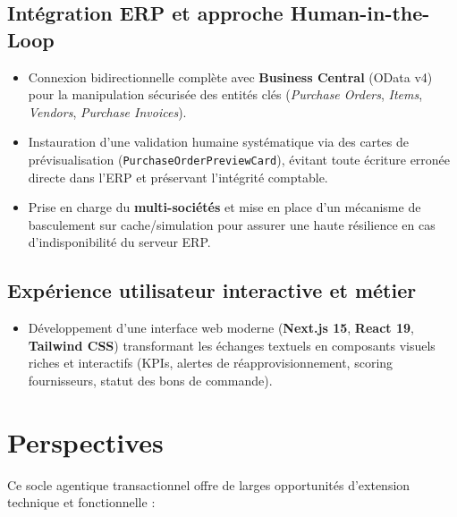 \subsection{Intégration ERP et approche Human-in-the-Loop}
\begin{itemize}
    \item Connexion bidirectionnelle complète avec \textbf{Business Central} (OData v4) pour la manipulation sécurisée des entités clés (\textit{Purchase Orders}, \textit{Items}, \textit{Vendors}, \textit{Purchase Invoices}).
    \item Instauration d'une validation humaine systématique via des cartes de prévisualisation (\texttt{PurchaseOrderPreviewCard}), évitant toute écriture erronée directe dans l'ERP et préservant l'intégrité comptable.
    \item Prise en charge du \textbf{multi-sociétés} et mise en place d'un mécanisme de basculement sur cache/simulation pour assurer une haute résilience en cas d'indisponibilité du serveur ERP.
\end{itemize}

\subsection{Expérience utilisateur interactive et métier}
\begin{itemize}
    \item Développement d'une interface web moderne (\textbf{Next.js 15}, \textbf{React 19}, \textbf{Tailwind CSS}) transformant les échanges textuels en composants visuels riches et interactifs (KPIs, alertes de réapprovisionnement, scoring fournisseurs, statut des bons de commande).
\end{itemize}

\section{Perspectives}

Ce socle agentique transactionnel offre de larges opportunités d'extension technique et fonctionnelle :

